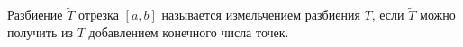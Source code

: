 
 	Разбиение $\widetilde T$ отрезка $[a,b]$ называется измельчением разбиения $T$,
 	если $\widetilde T$ можно получить из $T$ добавлением конечного числа точек.
 